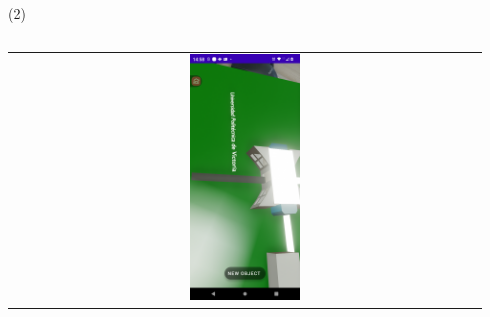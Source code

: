 \begin{frame}{  (2)}
\begin{columns}
\begin{column}{0.6\textwidth}
\begin{center}
\begin{tabular}{c}
\includegraphics[width=0.24\textwidth]{2022_MapaUPV_RealidadAumentada/figs/MapaUPV_04}\\         
      \end{tabular}
\end{center}
\end{column} 
\end{columns} 

\end{frame}





